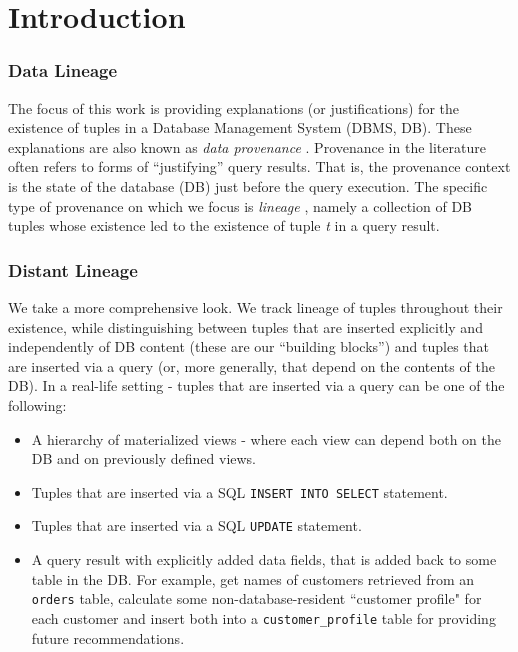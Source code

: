 \chapter{Introduction}
\label{chap:intro}


\subsection*{Data Lineage}
The focus of this work is providing explanations (or justifications) for the existence of tuples in a Database Management System (DBMS, DB). These explanations are also known as \textit{data provenance} \cite{cheney2009provenance}.
Provenance in the literature \cite{Ives2008, Deutch2015} often refers to forms of ``justifying'' query results. That is, the provenance context is the state of the database (DB) just before the query execution. The specific type of provenance on which we focus is \textit{lineage} \cite{Cui:2000:TLV:357775.357777}, namely a collection of DB tuples whose existence led to the existence of tuple \textit{t} in a query result. 


\subsection*{Distant Lineage}
We take a more comprehensive look. We track lineage of tuples throughout their existence, while distinguishing between tuples that are inserted explicitly and independently of DB content (these are our ``building blocks'') and tuples that are inserted via a query (or, more generally, that depend on the contents of the DB).
In a real-life setting - tuples that are inserted via a query can be one of the following:
\begin{itemize}
    \item A hierarchy of materialized views - where each view can depend both on the DB and on previously defined views.
    \item Tuples that are inserted via a SQL \texttt{INSERT INTO SELECT} statement.
    \item Tuples that are inserted via a SQL \texttt{UPDATE} statement.
    \item A query result with explicitly added data fields, that is added back to some table in the DB. For example, get names of customers retrieved from an \texttt{orders} table, calculate some non-database-resident ``customer profile" for each customer and insert both into a \texttt{customer\_profile} table for providing future recommendations.
\end{itemize}


